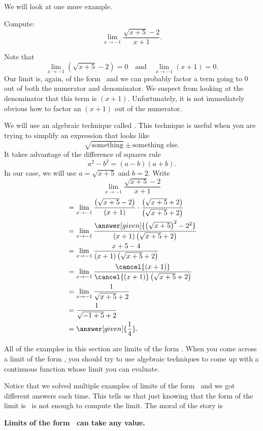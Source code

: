 \documentclass{ximera}
\begin{document}
We will  look at one more example.

\begin{example}
  Compute:
  \[
  \lim_{x\to-1} \frac{\sqrt{x+5}-2}{x+1}.
  \]

\begin{explanation} 
  Note that 
  \[
  \lim_{x\to-1} \left(\sqrt{x+5}-2\right)=0\quad\text{and}\quad\lim_{x\to -1} \left(x+1\right) =0.
  \]
  Our limit is, again, of the form \zeroOverZero\ and we
  can probably factor a term going to $0$ out of both the numerator
  and denominator.  We suspect from looking at the denominator that
  this term is $(x+1)$.  Unfortunately, it is not immediately obvious
  how to factor an $(x+1)$ out of the numerator.
 
  We will use an algebraic technique called .  This technique is useful when you are trying to
  simplify an expression that looks like
  \[
  \sqrt{\text{something}} \pm \text{something else}.
  \]
  It takes advantage of the difference of squares rule 
  \[
  a^2-b^2=(a-b)(a+b).
  \]
  In our case, we will use $a=\sqrt{x+5}$ and $b=2$.  Write
  \[
  \lim_{x\to-1} \frac{\sqrt{x+5}-2}{x+1}
  \]
  \begin{align*}
    &= \lim_{x\to-1} \frac{\left(\sqrt{x+5}-2\right)}{(x+1)} \cdot \frac{\left(\sqrt{x+5}+2\right)}{\left(\sqrt{x+5}+2\right)} \\
&=\lim_{x\to-1} \frac{\answer[given]{\left(\sqrt{x+5}\right)^2-2^2}}{(x+1)\left(\sqrt{x+5}+2\right)} \\
&=\lim_{x\to-1} \frac{x+5-4}{(x+1)\left(\sqrt{x+5}+2\right)} \\
&=\lim_{x\to-1} \frac{\cancel{(x+1)}}{\cancel{(x+1)}\left(\sqrt{x+5}+2\right)} \\
&=\lim_{x\to-1} \frac{1}{\sqrt{x+5}+2}\\
&= \frac{1}{\sqrt{-1+5}+2}\\
&=\answer[given]{\frac{1}{4}}.
\end{align*}
\end{explanation}
\end{example}

All of the examples in this section are limits of the form \zeroOverZero.
When you come across a limit of the form \zeroOverZero, you should try
to use algebraic techniques to come up with a continuous
function whose limit you can evaluate.

Notice that we solved multiple examples of limits of the form
\zeroOverZero\ and we got different answers each time.  This tells us
that just knowing that the form of the limit is \zeroOverZero\ is not enough
to compute the limit. The moral of the story is
\begin{center}
  \textbf{Limits of the form \zeroOverZero\ can take any value.}
\end{center}
\end{document}
